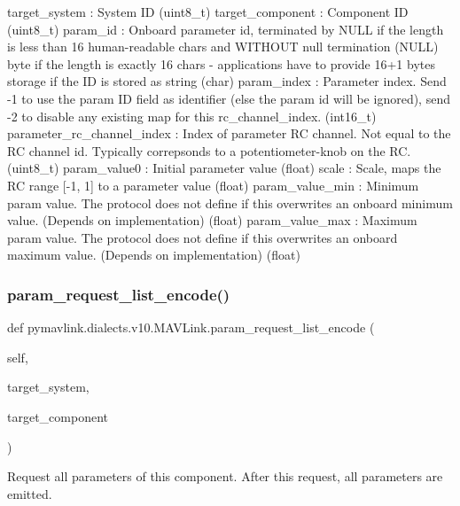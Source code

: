 \begin{DoxyVerb}
\begin{DoxyVerb}
\begin{DoxyVerb}
\begin{DoxyVerb}
\begin{DoxyVerb}
target_system             : System ID (uint8_t)
target_component          : Component ID (uint8_t)
param_id                  : Onboard parameter id, terminated by NULL if the length is less than 16 human-readable chars and WITHOUT null termination (NULL) byte if the length is exactly 16 chars - applications have to provide 16+1 bytes storage if the ID is stored as string (char)
param_index               : Parameter index. Send -1 to use the param ID field as identifier (else the param id will be ignored), send -2 to disable any existing map for this rc_channel_index. (int16_t)
parameter_rc_channel_index        : Index of parameter RC channel. Not equal to the RC channel id. Typically correpsonds to a potentiometer-knob on the RC. (uint8_t)
param_value0              : Initial parameter value (float)
scale                     : Scale, maps the RC range [-1, 1] to a parameter value (float)
param_value_min           : Minimum param value. The protocol does not define if this overwrites an onboard minimum value. (Depends on implementation) (float)
param_value_max           : Maximum param value. The protocol does not define if this overwrites an onboard maximum value. (Depends on implementation) (float)\end{DoxyVerb}
 \mbox{\label{classpymavlink_1_1dialects_1_1v10_1_1MAVLink_a7b715eab2da8bdd1cea6a2d0759b3af0}} 
\subsubsection{\texorpdfstring{param\+\_\+request\+\_\+list\+\_\+encode()}{param\_request\_list\_encode()}}
{\footnotesize\ttfamily def pymavlink.\+dialects.\+v10.\+M\+A\+V\+Link.\+param\+\_\+request\+\_\+list\+\_\+encode (\begin{DoxyParamCaption}\item[{}]{self,  }\item[{}]{target\+\_\+system,  }\item[{}]{target\+\_\+component }\end{DoxyParamCaption})}

\begin{DoxyVerb}Request all parameters of this component. After this request, all
parameters are emitted.


\end{DoxyVerb}
\end{DoxyVerb}
\end{DoxyVerb}
\end{DoxyVerb}
\end{DoxyVerb}

